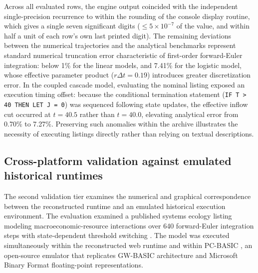 \documentclass[11pt,a4paper]{article}
\begin{document}
%
%
Across all evaluated rows, the engine output coincided with the independent single-precision recurrence to within the rounding of the console display routine, which gives a single seven significant digits ($\le 5\times10^{-7}$ of the value, and within half a unit of each row's own last printed digit). The remaining deviations between the numerical trajectories and the analytical benchmarks represent standard numerical truncation error characteristic of first-order forward-Euler integration: below 1\% for the linear models, and 7.41\% for the logistic model, whose effective parameter product ($r\Delta t = 0.19$) introduces greater discretization error. In the coupled cascade model, evaluating the nominal listing exposed an execution timing offset: because the conditional termination statement (\texttt{IF T > 40 THEN LET J = 0}) was sequenced following state updates, the effective inflow cut occurred at $t = 40.5$ rather than $t = 40.0$, elevating analytical error from 0.70\% to 7.27\%. Preserving such anomalies within the archive illustrates the necessity of executing listings directly rather than relying on textual descriptions.

\subsection{Cross-platform validation against emulated historical runtimes}

The second validation tier examines the numerical and graphical correspondence between the reconstructed runtime and an emulated historical execution environment. The evaluation examined a published systems ecology listing modeling macroeconomic-resource interactions over 640 forward-Euler integration steps with state-dependent threshold switching \citep[Table~3]{odum1989}. The model was executed simultaneously within the reconstructed web runtime and within PC-BASIC \citep{pcbasic}, an open-source emulator that replicates GW-BASIC architecture and Microsoft Binary Format floating-point representations.
\end{document}
